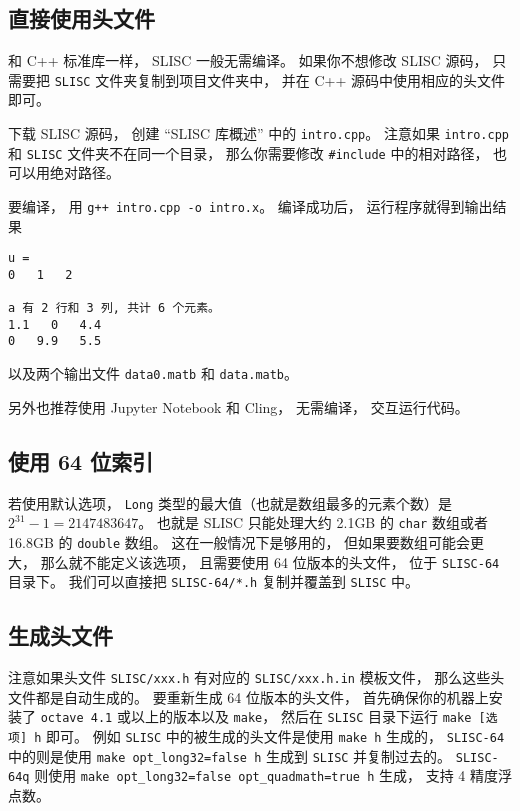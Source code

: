 
\begin{issues}
\issueDraft
\end{issues}


\subsection{直接使用头文件}
和 C++ 标准库一样， SLISC 一般无需编译。 如果你不想修改 SLISC 源码， 只需要把 \verb|SLISC| 文件夹复制到项目文件夹中， 并在 C++ 源码中使用相应的头文件即可。

下载 SLISC 源码， 创建 “SLISC 库概述” 中的 \verb|intro.cpp|。 注意如果 \verb|intro.cpp| 和 \verb|SLISC| 文件夹不在同一个目录， 那么你需要修改 \verb|#include| 中的相对路径， 也可以用绝对路径。

要编译， 用 \verb|g++ intro.cpp -o intro.x|。 编译成功后， 运行程序就得到输出结果
\begin{lstlisting}[language=none]
u = 
0   1   2   

a 有 2 行和 3 列, 共计 6 个元素。
1.1   0   4.4   
0   9.9   5.5
\end{lstlisting}
以及两个输出文件 \verb|data0.matb| 和 \verb|data.matb|。

另外也推荐使用 Jupyter Notebook 和 Cling， 无需编译， 交互运行代码。

\subsection{使用 64 位索引}
若使用默认选项， \verb|Long| 类型的最大值（也就是数组最多的元素个数）是 $2^{31}-1 = 2147483647$。 也就是 SLISC 只能处理大约 2.1GB 的 \verb|char| 数组或者 16.8GB 的 \verb|double| 数组。 这在一般情况下是够用的， 但如果要数组可能会更大， 那么就不能定义该选项， 且需要使用 64 位版本的头文件， 位于 \verb|SLISC-64| 目录下。 我们可以直接把 \verb|SLISC-64/*.h| 复制并覆盖到 \verb|SLISC| 中。

\subsection{生成头文件}

注意如果头文件 \verb|SLISC/xxx.h| 有对应的 \verb|SLISC/xxx.h.in| 模板文件， 那么这些头文件都是自动生成的。 要重新生成 64 位版本的头文件， 首先确保你的机器上安装了 \verb|octave 4.1| 或以上的版本以及 \verb|make|， 然后在 \verb|SLISC| 目录下运行 \verb|make [选项] h| 即可。 例如 \verb|SLISC| 中的被生成的头文件是使用 \verb|make h| 生成的， \verb|SLISC-64| 中的则是使用 \verb|make opt_long32=false h| 生成到 \verb|SLISC| 并复制过去的。 \verb|SLISC-64q| 则使用 \verb|make opt_long32=false opt_quadmath=true h| 生成， 支持 4 精度浮点数。

